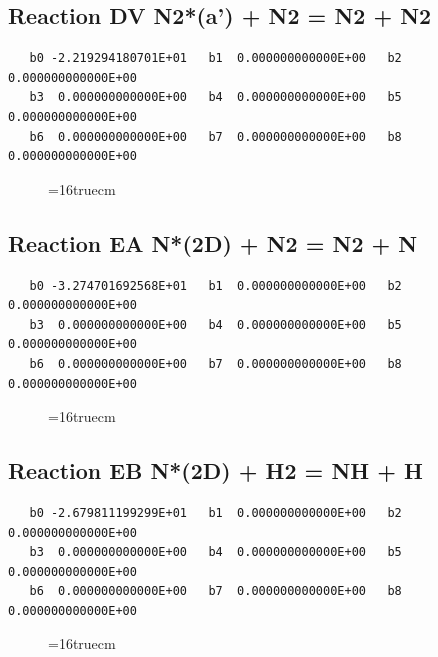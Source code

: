 \documentclass[12pt,dvipdfm]{article}
\begin{document}
\subsection{
Reaction DV N2*(a') + N2 = N2 + N2 }
\begin{small}\begin{verbatim}
   b0 -2.219294180701E+01   b1  0.000000000000E+00   b2  0.000000000000E+00
   b3  0.000000000000E+00   b4  0.000000000000E+00   b5  0.000000000000E+00
   b6  0.000000000000E+00   b7  0.000000000000E+00   b8  0.000000000000E+00
\end{verbatim}\end{small}
\begin{figure}[h!] \label{n2rates}
\epsfxsize=16truecm
\end{figure}
\newpage

\subsection{
Reaction EA N*(2D) + N2 = N2 + N }
\begin{small}\begin{verbatim}
   b0 -3.274701692568E+01   b1  0.000000000000E+00   b2  0.000000000000E+00
   b3  0.000000000000E+00   b4  0.000000000000E+00   b5  0.000000000000E+00
   b6  0.000000000000E+00   b7  0.000000000000E+00   b8  0.000000000000E+00
\end{verbatim}\end{small}
\begin{figure}[h!] \label{n2rates}
\epsfxsize=16truecm
\end{figure}
\newpage

\subsection{
Reaction EB N*(2D) + H2 = NH + H }
\begin{small}\begin{verbatim}
   b0 -2.679811199299E+01   b1  0.000000000000E+00   b2  0.000000000000E+00
   b3  0.000000000000E+00   b4  0.000000000000E+00   b5  0.000000000000E+00
   b6  0.000000000000E+00   b7  0.000000000000E+00   b8  0.000000000000E+00
\end{verbatim}\end{small}
\begin{figure}[h!] \label{n2rates}
\epsfxsize=16truecm
\end{figure}
\newpage
\end{document}

